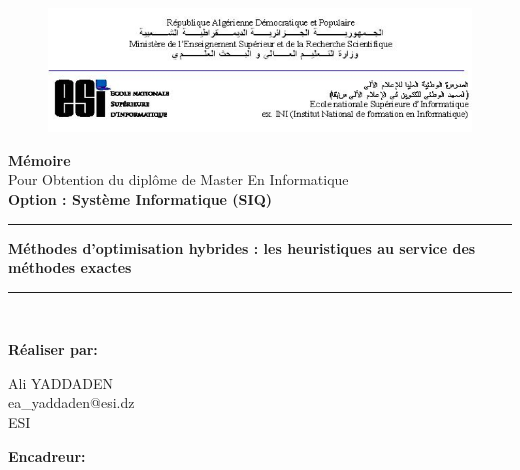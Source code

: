 \begin{titlepage}





	\begin{figure}[t]
		\includegraphics[scale=0.75]{ESI.png}\\[0.6in]
	\end{figure}
	
	
	
	\begin{center}
	
		\LARGE \textbf{ Mémoire}\\
		\Large{
			Pour Obtention du diplôme de Master En Informatique\\
			\textbf{Option : Système Informatique (SIQ)}
		}\\
		\huge {
		\rule{\linewidth}{.5pt}
			\textbf{
				Méthodes d’optimisation hybrides : les heuristiques au service des méthodes exactes
			} 
			\rule{\linewidth}{.5pt}
		}\\[0.4in]
		\Large
	
	\textbf{Réaliser par:}\\
	\begin{multicols}{}
			\Large 	Ali YADDADEN\\
			\large ea\_yaddaden@esi.dz\\
			ESI\\
		
	\end{multicols} 
	
	\vskip 0.13in

	 \textbf{Encadreur:}
	 

\end{center}
\end{titlepage}
